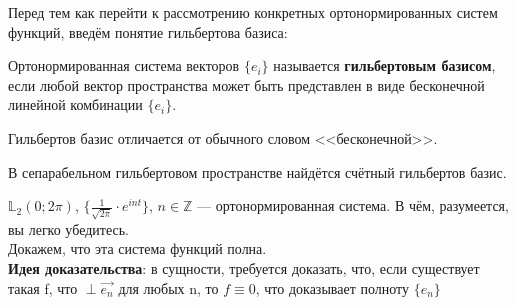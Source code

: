 \documentclass[12pt]{article}
\begin{document}
		Перед тем как перейти к рассмотрению конкретных ортонормированных систем функций, введём понятие гильбертова базиса:
		\begin{defi}
			Ортонормированная система векторов $\{ e_i \}$ называется \textbf{гильбертовым базисом}, если любой вектор
			пространства может быть представлен в виде бесконечной линейной комбинации $ \{ e_i \} $.
		\end{defi}
	
		{\color{gray} Гильбертов базис отличается от обычного словом <<бесконечной>>.}
	
		\begin{state}
			В сепарабельном гильбертовом пространстве найдётся счётный гильбертов базис.
		\end{state}
	
		\example $\mathbb{L}_2 (0; 2\pi)$, $\{ \frac{1}{\sqrt{2\pi}} \cdot e^{int} \}$, $n \in \mathbb{Z}$ --- ортонормированная система.
		{\color{gray} В чём, разумеется, вы легко убедитесь.}\\
		Докажем, что эта система функций полна.\\
		\textbf{Идея доказательства}: в сущности, требуется доказать, что, если существует такая f, что $\perp \vec{e_n}$
		для любых n, то $f \equiv 0$, что доказывает полноту $\{ e_n \}$
\end{document}
